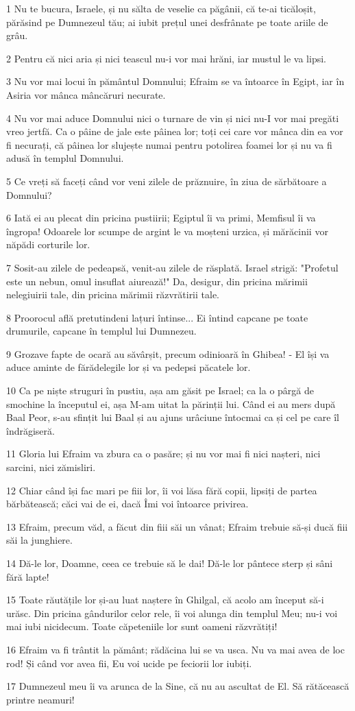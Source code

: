 \par 1 Nu te bucura, Israele, și nu sălta de veselie ca păgânii, că te-ai ticăloșit, părăsind pe Dumnezeul tău; ai iubit prețul unei desfrânate pe toate ariile de grâu.
\par 2 Pentru că nici aria și nici teascul nu-i vor mai hrăni, iar mustul le va lipsi.
\par 3 Nu vor mai locui în pământul Domnului; Efraim se va întoarce în Egipt, iar în Asiria vor mânca mâncăruri necurate.
\par 4 Nu vor mai aduce Domnului nici o turnare de vin și nici nu-I vor mai pregăti vreo jertfă. Ca o pâine de jale este pâinea lor; toți cei care vor mânca din ea vor fi necurați, că pâinea lor slujește numai pentru potolirea foamei lor și nu va fi adusă în templul Domnului.
\par 5 Ce vreți să faceți când vor veni zilele de prăznuire, în ziua de sărbătoare a Domnului?
\par 6 Iată ei au plecat din pricina pustiirii; Egiptul îi va primi, Memfisul îi va îngropa! Odoarele lor scumpe de argint le va moșteni urzica, și mărăcinii vor năpădi corturile lor.
\par 7 Sosit-au zilele de pedeapsă, venit-au zilele de răsplată. Israel strigă: "Profetul este un nebun, omul insuflat aiurează!" Da, desigur, din pricina mărimii nelegiuirii tale, din pricina mărimii răzvrătirii tale.
\par 8 Proorocul află pretutindeni lațuri întinse... Ei întind capcane pe toate drumurile, capcane în templul lui Dumnezeu.
\par 9 Grozave fapte de ocară au săvârșit, precum odinioară în Ghibea! - El își va aduce aminte de fărădelegile lor și va pedepsi păcatele lor.
\par 10 Ca pe niște struguri în pustiu, așa am găsit pe Israel; ca la o pârgă de smochine la începutul ei, așa M-am uitat la părinții lui. Când ei au mers după Baal Peor, s-au sfințit lui Baal și au ajuns urâciune întocmai ca și cel pe care îl îndrăgiseră.
\par 11 Gloria lui Efraim va zbura ca o pasăre; și nu vor mai fi nici nașteri, nici sarcini, nici zămisliri.
\par 12 Chiar când își fac mari pe fiii lor, îi voi lăsa fără copii, lipsiți de partea bărbătească; căci vai de ei, dacă Îmi voi întoarce privirea.
\par 13 Efraim, precum văd, a făcut din fiii săi un vânat; Efraim trebuie să-și ducă fiii săi la junghiere.
\par 14 Dă-le lor, Doamne, ceea ce trebuie să le dai! Dă-le lor pântece sterp și sâni fără lapte!
\par 15 Toate răutățile lor și-au luat naștere în Ghilgal, că acolo am început să-i urăsc. Din pricina gândurilor celor rele, îi voi alunga din templul Meu; nu-i voi mai iubi nicidecum. Toate căpeteniile lor sunt oameni răzvrătiți!
\par 16 Efraim va fi trântit la pământ; rădăcina lui se va usca. Nu va mai avea de loc rod! Și când vor avea fii, Eu voi ucide pe feciorii lor iubiți.
\par 17 Dumnezeul meu îi va arunca de la Sine, că nu au ascultat de El. Să rătăcească printre neamuri!

